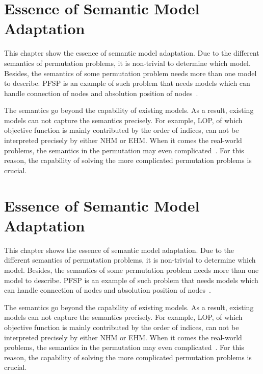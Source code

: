 
\section{Essence of Semantic Model Adaptation}
\label{ch:essence_of_adaptation}




This chapter show the essence of semantic model adaptation. Due to the different semantics of permutation problems, it is non-trivial to determine which model. Besides, the semantics of some permutation problem needs more than one model to describe. PFSP is an example of such problem that needs models which can handle connection of nodes and absolution position of nodes~\citep{tsutsui2006node}. 

The semantics go beyond the capability of existing models. As a result, existing models can not capture the semantics precisely. For example, LOP, of which objective function is mainly contributed by the order of indices, can not be interpreted precisely by either NHM or EHM. When it comes the real-world problems, the semantics in the permutation may even complicated~\citep{ceberio2012review}. For this reason, the capability of solving the more complicated permutation problems is crucial.

\section{Essence of Semantic Model Adaptation}
\label{ch:essence_of_adaptation}




This chapter shows the essence of semantic model adaptation. Due to the different semantics of permutation problems, it is non-trivial to determine which model. Besides, the semantics of some permutation problem needs more than one model to describe. PFSP is an example of such problem that needs models which can handle connection of nodes and absolution position of nodes~\citep{tsutsui2006node}. 

The semantics go beyond the capability of existing models. As a result, existing models can not capture the semantics precisely. For example, LOP, of which objective function is mainly contributed by the order of indices, can not be interpreted precisely by either NHM or EHM. When it comes the real-world problems, the semantics in the permutation may even complicated~\citep{ceberio2012review}. For this reason, the capability of solving the more complicated permutation problems is crucial.

